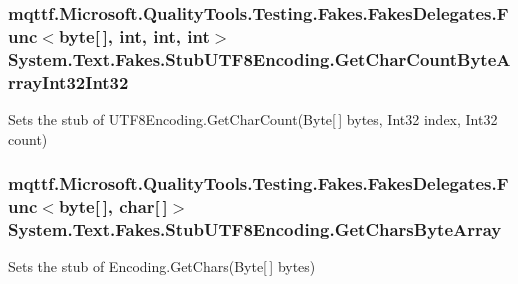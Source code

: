 \hypertarget{class_system_1_1_text_1_1_fakes_1_1_stub_u_t_f8_encoding_aeb79dad2d5d1ab252091e75da9c1c505}{
\subsubsection[{Get\-Char\-Count\-Byte\-Array\-Int32\-Int32}]{\setlength{\rightskip}{0pt plus 5cm}mqttf.\-Microsoft.\-Quality\-Tools.\-Testing.\-Fakes.\-Fakes\-Delegates.\-Func$<$byte\mbox{[}$\,$\mbox{]}, int, int, int$>$ System.\-Text.\-Fakes.\-Stub\-U\-T\-F8\-Encoding.\-Get\-Char\-Count\-Byte\-Array\-Int32\-Int32}}\label{class_system_1_1_text_1_1_fakes_1_1_stub_u_t_f8_encoding_aeb79dad2d5d1ab252091e75da9c1c505}


Sets the stub of U\-T\-F8\-Encoding.\-Get\-Char\-Count(\-Byte\mbox{[}$\,$\mbox{]} bytes, Int32 index, Int32 count)

\hypertarget{class_system_1_1_text_1_1_fakes_1_1_stub_u_t_f8_encoding_ae92ce745c1c82627c8b21b8e6b728054}{
\subsubsection[{Get\-Chars\-Byte\-Array}]{\setlength{\rightskip}{0pt plus 5cm}mqttf.\-Microsoft.\-Quality\-Tools.\-Testing.\-Fakes.\-Fakes\-Delegates.\-Func$<$byte\mbox{[}$\,$\mbox{]}, char\mbox{[}$\,$\mbox{]}$>$ System.\-Text.\-Fakes.\-Stub\-U\-T\-F8\-Encoding.\-Get\-Chars\-Byte\-Array}}\label{class_system_1_1_text_1_1_fakes_1_1_stub_u_t_f8_encoding_ae92ce745c1c82627c8b21b8e6b728054}


Sets the stub of Encoding.\-Get\-Chars(\-Byte\mbox{[}$\,$\mbox{]} bytes)

